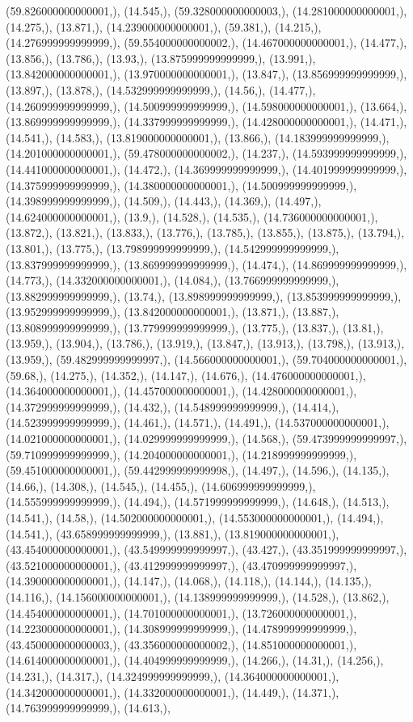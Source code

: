 \documentclass{article}
\begin{document}
(59.826000000000001,), (14.545,), (59.328000000000003,), (14.281000000000001,), (14.275,), (13.871,), (14.239000000000001,), (59.381,), (14.215,), (14.276999999999999,), (59.554000000000002,), (14.467000000000001,), (14.477,), (13.856,), (13.786,), (13.93,), (13.875999999999999,), (13.991,), (13.842000000000001,), (13.970000000000001,), (13.847,), (13.856999999999999,), (13.897,), (13.878,), (14.532999999999999,), (14.56,), (14.477,), (14.260999999999999,), (14.500999999999999,), (14.598000000000001,), (13.664,), (13.869999999999999,), (14.337999999999999,), (14.428000000000001,), (14.471,), (14.541,), (14.583,), (13.819000000000001,), (13.866,), (14.183999999999999,), (14.201000000000001,), (59.478000000000002,), (14.237,), (14.593999999999999,), (14.441000000000001,), (14.472,), (14.369999999999999,), (14.401999999999999,), (14.375999999999999,), (14.380000000000001,), (14.500999999999999,), (14.398999999999999,), (14.509,), (14.443,), (14.369,), (14.497,), (14.624000000000001,), (13.9,), (14.528,), (14.535,), (14.736000000000001,), (13.872,), (13.821,), (13.833,), (13.776,), (13.785,), (13.855,), (13.875,), (13.794,), (13.801,), (13.775,), (13.798999999999999,), (14.542999999999999,), (13.837999999999999,), (13.869999999999999,), (14.474,), (14.869999999999999,), (14.773,), (14.332000000000001,), (14.084,), (13.766999999999999,), (13.882999999999999,), (13.74,), (13.898999999999999,), (13.853999999999999,), (13.952999999999999,), (13.842000000000001,), (13.871,), (13.887,), (13.808999999999999,), (13.779999999999999,), (13.775,), (13.837,), (13.81,), (13.959,), (13.904,), (13.786,), (13.919,), (13.847,), (13.913,), (13.798,), (13.913,), (13.959,), (59.482999999999997,), (14.566000000000001,), (59.704000000000001,), (59.68,), (14.275,), (14.352,), (14.147,), (14.676,), (14.476000000000001,), (14.364000000000001,), (14.457000000000001,), (14.428000000000001,), (14.372999999999999,), (14.432,), (14.548999999999999,), (14.414,), (14.523999999999999,), (14.461,), (14.571,), (14.491,), (14.537000000000001,), (14.021000000000001,), (14.029999999999999,), (14.568,), (59.473999999999997,), (59.710999999999999,), (14.204000000000001,), (14.218999999999999,), (59.451000000000001,), (59.442999999999998,), (14.497,), (14.596,), (14.135,), (14.66,), (14.308,), (14.545,), (14.455,), (14.606999999999999,), (14.555999999999999,), (14.494,), (14.571999999999999,), (14.648,), (14.513,), (14.541,), (14.58,), (14.502000000000001,), (14.553000000000001,), (14.494,), (14.541,), (43.658999999999999,), (13.881,), (13.819000000000001,), (43.454000000000001,), (43.549999999999997,), (43.427,), (43.351999999999997,), (43.521000000000001,), (43.412999999999997,), (43.470999999999997,), (14.390000000000001,), (14.147,), (14.068,), (14.118,), (14.144,), (14.135,), (14.116,), (14.156000000000001,), (14.138999999999999,), (14.528,), (13.862,), (14.454000000000001,), (14.701000000000001,), (13.726000000000001,), (14.223000000000001,), (14.308999999999999,), (14.478999999999999,), (43.450000000000003,), (43.356000000000002,), (14.851000000000001,), (14.614000000000001,), (14.404999999999999,), (14.266,), (14.31,), (14.256,), (14.231,), (14.317,), (14.324999999999999,), (14.364000000000001,), (14.342000000000001,), (14.332000000000001,), (14.449,), (14.371,), (14.763999999999999,), (14.613,), 
\end{document}
